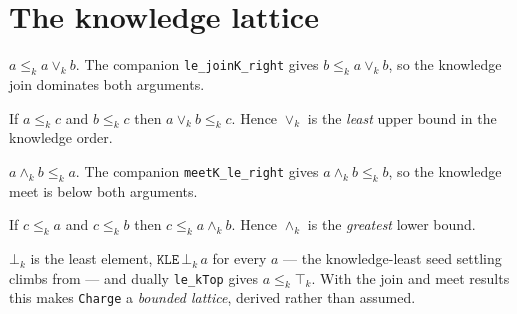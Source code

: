 \section{The knowledge lattice}
\begin{theorem}\label{thm:le-joink}\leanok{}
$a \le_k a \vee_k b$. The companion \texttt{le\_joinK\_right} gives
$b \le_k a \vee_k b$, so the knowledge join dominates both arguments.
\end{theorem}
\begin{theorem}\label{thm:joink-le}\leanok{}
If $a \le_k c$ and $b \le_k c$ then $a \vee_k b \le_k c$. Hence $\vee_k$ is the
\emph{least} upper bound in the knowledge order.
\end{theorem}
\begin{theorem}\label{thm:meetk-le}\leanok{}
$a \wedge_k b \le_k a$. The companion \texttt{meetK\_le\_right} gives
$a \wedge_k b \le_k b$, so the knowledge meet is below both arguments.
\end{theorem}
\begin{theorem}\label{thm:le-meetk}\leanok{}
If $c \le_k a$ and $c \le_k b$ then $c \le_k a \wedge_k b$. Hence $\wedge_k$ is
the \emph{greatest} lower bound.
\end{theorem}
\begin{theorem}\label{thm:kbot-ktop}\leanok{}
$\bot_k$ is the least element, $\texttt{KLE}\,\bot_k\,a$ for every $a$ --- the
knowledge-least seed settling climbs from --- and dually
\texttt{le\_kTop} gives $a \le_k \top_k$. With the join and meet results this
makes \texttt{Charge} a \emph{bounded lattice}, derived rather than assumed.
\end{theorem}
